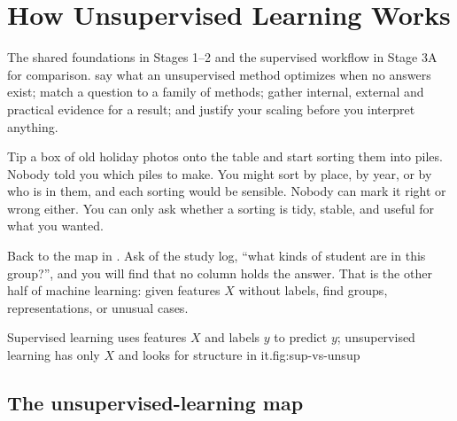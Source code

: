 \chapter{How Unsupervised Learning Works}
\label{ch:unsupervised}

\chapterguide%
  {The shared foundations in Stages 1--2 and the supervised workflow in Stage 3A for comparison.}
  {say what an unsupervised method optimizes when no answers exist; match a question to a family of methods; gather internal, external and practical evidence for a result; and justify your scaling before you interpret anything.}

Tip a box of old holiday photos onto the table and start sorting them into piles. Nobody told you which piles to make. You might sort by place, by year, or by who is in them, and each sorting would be sensible. Nobody can mark it right or wrong either. You can only ask whether a sorting is tidy, stable, and useful for what you wanted.

Back to the map in . Ask of the study log, ``what kinds of student are in this group?'', and you will find that no column holds the answer. That is the other half of machine learning: given features $X$ without labels, find groups, representations, or unusual cases.

\begin{utpfig}{Supervised learning uses features $X$ and labels $y$ to predict $y$; unsupervised learning has only $X$ and looks for structure in it.}{fig:sup-vs-unsup}
\end{utpfig}

\section{The unsupervised-learning map}

